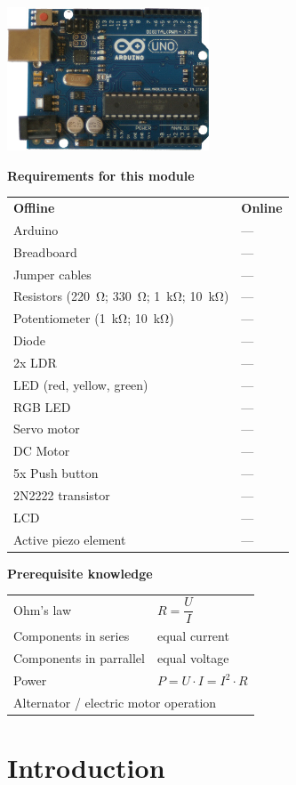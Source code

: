 \documentclass{arduino}
\begin{document}
\includegraphics[width=6cm]{1. Arduino}

\textbf{Requirements for this module}

\begin{tabular}{p{}p{}}
\textbf{Offline} & \textbf{Online}\\
Arduino & --- \\
Breadboard & --- \\
Jumper cables & --- \\
Resistors (\SI{220}{\ohm}; \SI{330}{\ohm}; \SI{1}{\kilo\ohm}; \SI{10}{\kilo\ohm}) & --- \\
Potentiometer (\SI{1}{\kilo\ohm}; \SI{10}{\kilo\ohm}) & --- \\
Diode & --- \\
2x LDR & --- \\
LED (red, yellow, green) & --- \\
RGB LED & --- \\
Servo motor & --- \\
DC Motor & --- \\
5x Push button & --- \\
2N2222 transistor & --- \\
LCD & --- \\
Active piezo element & --- \\
\end{tabular}

\textbf{Prerequisite knowledge}

\begin{tabular}{ll}
Ohm's law & $R = \dfrac{U}{I}$\\
Components in series & equal current \\
Components in parrallel & equal voltage \\
Power & $P = U \cdot I = I^2 \cdot R$ \\
\multicolumn{2}{l}{Alternator / electric motor operation}\\
\end{tabular}

\newpage

\section{Introduction}
\end{document}

